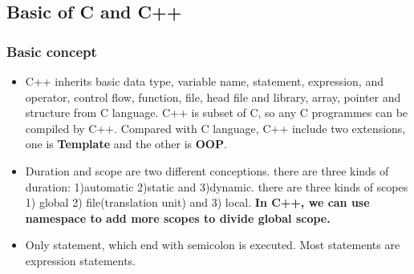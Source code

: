 \documentclass[a4paper,12pt,twoside]{book}
\begin{document}
\subsection{Basic of C and C++}
\subsubsection{Basic concept}
\begin{itemize}
\item C++ inherits  basic data type, variable name, statement, expression, and operator, control flow, function, file, head file and library, array, pointer and structure from C language. C++ is subset of C, so any C programmes can be compiled by C++. Compared with C language,  C++ include two extensions, one is \textbf{Template} and the other is \textbf{OOP}.

\item Duration and scope are two different conceptions. there are three kinds of duration: 1)automatic 2)static and 3)dynamic. there are three kinds of scopes 1) global 2) file(translation unit) and 3) local. \textbf{In C++, we can use namespace to add more scopes to divide global scope. }

\item Only statement, which end with semicolon is executed. Most statements are expression statements.

\end{itemize}
\end{document}
